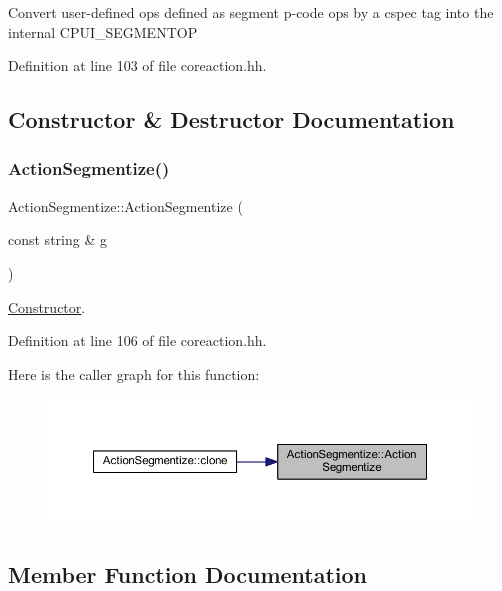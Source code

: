 Convert user-\/defined ops defined as segment p-\/code ops by a cspec tag into the internal C\+P\+U\+I\+\_\+\+S\+E\+G\+M\+E\+N\+T\+OP 

Definition at line 103 of file coreaction.\+hh.



\subsection{Constructor \& Destructor Documentation}
\mbox{\label{class_action_segmentize_ad2206f23e2af24a5361533763eebfed3}} 
\subsubsection{\texorpdfstring{ActionSegmentize()}{ActionSegmentize()}}
{\footnotesize\ttfamily Action\+Segmentize\+::\+Action\+Segmentize (\begin{DoxyParamCaption}\item[{const string \&}]{g }\end{DoxyParamCaption})\hspace{0.3cm}{\ttfamily [inline]}}



\mbox{\hyperlink{class_constructor}{Constructor}}. 



Definition at line 106 of file coreaction.\+hh.

Here is the caller graph for this function\+:
\nopagebreak
\begin{figure}[H]
\begin{center}
\leavevmode
\includegraphics[width=350pt]{class_action_segmentize_ad2206f23e2af24a5361533763eebfed3_icgraph}
\end{center}
\end{figure}


\subsection{Member Function Documentation}
\mbox{\label{class_action_segmentize_a3219ac91c09b6c6061d7e91ad1ed9111}} 
